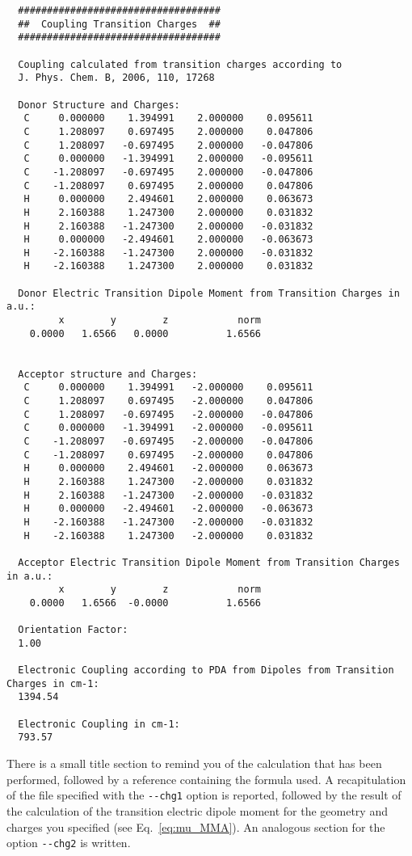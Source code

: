 \documentclass[a4paper]{article}
\begin{document}
\begin{verbatim}
  ###################################
  ##  Coupling Transition Charges  ##
  ###################################
  
  Coupling calculated from transition charges according to
  J. Phys. Chem. B, 2006, 110, 17268
  
  Donor Structure and Charges:
   C     0.000000    1.394991    2.000000    0.095611
   C     1.208097    0.697495    2.000000    0.047806
   C     1.208097   -0.697495    2.000000   -0.047806
   C     0.000000   -1.394991    2.000000   -0.095611
   C    -1.208097   -0.697495    2.000000   -0.047806
   C    -1.208097    0.697495    2.000000    0.047806
   H     0.000000    2.494601    2.000000    0.063673
   H     2.160388    1.247300    2.000000    0.031832
   H     2.160388   -1.247300    2.000000   -0.031832
   H     0.000000   -2.494601    2.000000   -0.063673
   H    -2.160388   -1.247300    2.000000   -0.031832
   H    -2.160388    1.247300    2.000000    0.031832
  
  Donor Electric Transition Dipole Moment from Transition Charges in a.u.:
         x        y        z            norm
    0.0000   1.6566   0.0000          1.6566
  
  
  Acceptor structure and Charges:
   C     0.000000    1.394991   -2.000000    0.095611
   C     1.208097    0.697495   -2.000000    0.047806
   C     1.208097   -0.697495   -2.000000   -0.047806
   C     0.000000   -1.394991   -2.000000   -0.095611
   C    -1.208097   -0.697495   -2.000000   -0.047806
   C    -1.208097    0.697495   -2.000000    0.047806
   H     0.000000    2.494601   -2.000000    0.063673
   H     2.160388    1.247300   -2.000000    0.031832
   H     2.160388   -1.247300   -2.000000   -0.031832
   H     0.000000   -2.494601   -2.000000   -0.063673
   H    -2.160388   -1.247300   -2.000000   -0.031832
   H    -2.160388    1.247300   -2.000000    0.031832
  
  Acceptor Electric Transition Dipole Moment from Transition Charges in a.u.:
         x        y        z            norm
    0.0000   1.6566  -0.0000          1.6566
  
  Orientation Factor:
  1.00
  
  Electronic Coupling according to PDA from Dipoles from Transition Charges in cm-1:
  1394.54   
  
  Electronic Coupling in cm-1:
  793.57 
\end{verbatim}

There is a small title section to remind you of the calculation that has been performed, followed by a reference containing the formula used. A recapitulation of the file specified with the \verb|--chg1| option is reported, followed by the result of the calculation of the transition electric dipole moment for the geometry and charges you specified (see Eq.~\ref{eq:mu_MMA}). An analogous section for the option \verb|--chg2| is written.
\end{document}
